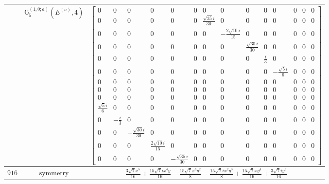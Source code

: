 \documentclass[fleqn,8pt,landscape]{jsarticle}
\begin{document}
\begin{longtable}{ccc}
$  $ & $ \mathbb{G}_{5}^{(1,0;a)}(E^{(a)},4) $ & $ \begin{bmatrix} 0 & 0 & 0 & 0 & 0 & 0 & 0 & 0 & 0 & 0 & 0 & 0 & 0 & 0 \\ 0 & 0 & 0 & 0 & 0 & 0 & \frac{\sqrt{35} i}{30} & 0 & 0 & 0 & 0 & 0 & 0 & 0 \\ 0 & 0 & 0 & 0 & 0 & 0 & 0 & - \frac{2 \sqrt{10} i}{15} & 0 & 0 & 0 & 0 & 0 & 0 \\ 0 & 0 & 0 & 0 & 0 & 0 & 0 & 0 & \frac{\sqrt{30} i}{30} & 0 & 0 & 0 & 0 & 0 \\ 0 & 0 & 0 & 0 & 0 & 0 & 0 & 0 & 0 & \frac{i}{3} & 0 & 0 & 0 & 0 \\ 0 & 0 & 0 & 0 & 0 & 0 & 0 & 0 & 0 & 0 & - \frac{\sqrt{5} i}{6} & 0 & 0 & 0 \\ 0 & 0 & 0 & 0 & 0 & 0 & 0 & 0 & 0 & 0 & 0 & 0 & 0 & 0 \\ 0 & 0 & 0 & 0 & 0 & 0 & 0 & 0 & 0 & 0 & 0 & 0 & 0 & 0 \\ 0 & 0 & 0 & 0 & 0 & 0 & 0 & 0 & 0 & 0 & 0 & 0 & 0 & 0 \\ \frac{\sqrt{5} i}{6} & 0 & 0 & 0 & 0 & 0 & 0 & 0 & 0 & 0 & 0 & 0 & 0 & 0 \\ 0 & - \frac{i}{3} & 0 & 0 & 0 & 0 & 0 & 0 & 0 & 0 & 0 & 0 & 0 & 0 \\ 0 & 0 & - \frac{\sqrt{30} i}{30} & 0 & 0 & 0 & 0 & 0 & 0 & 0 & 0 & 0 & 0 & 0 \\ 0 & 0 & 0 & \frac{2 \sqrt{10} i}{15} & 0 & 0 & 0 & 0 & 0 & 0 & 0 & 0 & 0 & 0 \\ 0 & 0 & 0 & 0 & - \frac{\sqrt{35} i}{30} & 0 & 0 & 0 & 0 & 0 & 0 & 0 & 0 & 0 \end{bmatrix} $ \\ \hline
$ 916 $ & $ \text{symmetry} $ & $ \frac{3 \sqrt{7} x^{5}}{16} + \frac{15 \sqrt{7} i x^{4} y}{16} - \frac{15 \sqrt{7} x^{3} y^{2}}{8} - \frac{15 \sqrt{7} i x^{2} y^{3}}{8} + \frac{15 \sqrt{7} x y^{4}}{16} + \frac{3 \sqrt{7} i y^{5}}{16} $ \\

\end{longtable}
\end{document}
